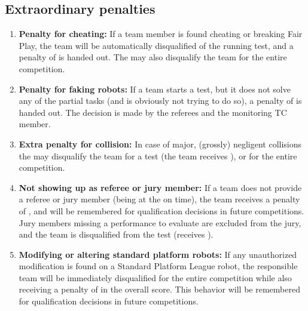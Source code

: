 \subsection{Extraordinary penalties}\label{rule:extraordinary_penalties}
\begin{enumerate}
	\item \textbf{Penalty for cheating:} If a team member is found cheating or breaking Fair Play, the team will be automatically disqualified of the running test, and a penalty of  is handed out.
	The  may also disqualify the team for the entire competition.

	\item \textbf{Penalty for faking robots:} If a team starts a test, but it does not solve any of the partial tasks (and is obviously not trying to do so), a penalty of  is handed out.
	The decision is made by the referees and the monitoring TC member.

	\item \textbf{Extra penalty for collision:} In case of major, (grossly) negligent collisions the  may disqualify the team for a test (the team receives ), or for the entire competition.

	\item \textbf{Not showing up as referee or jury member:} If a team does not provide a referee or jury member (being at the \Arena{} on time), the team receives a penalty of , and will be remembered for qualification decisions in future competitions.\\
	Jury members missing a performance to evaluate are excluded from the jury, and the team is disqualified from the test (receives ).

	\item \textbf{Modifying or altering standard platform robots:} If any unauthorized modification is found on a Standard Platform League robot, the responsible team will be immediately disqualified for the entire competition while also receiving a penalty of  in the overall score. This behavior will be remembered for qualification decisions in future competitions.\\
\end{enumerate}

